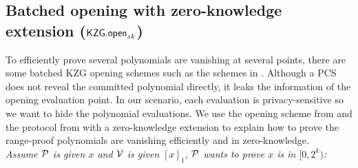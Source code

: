 \subsection{Batched opening with zero-knowledge extension ($\mathsf{KZG.open}_{zk}$)}
\label{sec:kgzzkp}


To efficiently prove several polynomials are vanishing at several points, there are some batched KZG opening schemes such as the schemes in \cite{plonk,bdfg,fflonk}. Although a PCS does not reveal the committed polynomial directly, it leaks the information of the opening evaluation point. In our scenario, each evaluation is privacy-sensitive so we want to hide the polynomial evaluations. We use the opening scheme from \cite{plonk} and the protocol from \cite{rangeproof} with a zero-knowledge extension to explain how to prove the range-proof polynomials are vanishing efficiently and in zero-knowledge. \\
\textit{Assume $\mathcal{P}$ is given $x$ and $\mathcal{V}$ is given $[x]_1$, $\mathcal{P}$ wants to prove $x$ is in $[0,2^k)$:}
